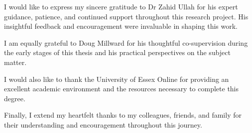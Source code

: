 \vspace{1cm}
I would like to express my sincere gratitude to Dr Zahid Ullah for his expert guidance, patience, and continued support throughout this research project. His insightful feedback and encouragement were invaluable in shaping this work.

I am equally grateful to Doug Millward for his thoughtful co-supervision during the early stages of this thesis and his practical perspectives on the subject matter.

I would also like to thank the University of Essex Online for providing an excellent academic environment and the resources necessary to complete this degree.

Finally, I extend my heartfelt thanks to my colleagues, friends, and family for their understanding and encouragement throughout this journey.
